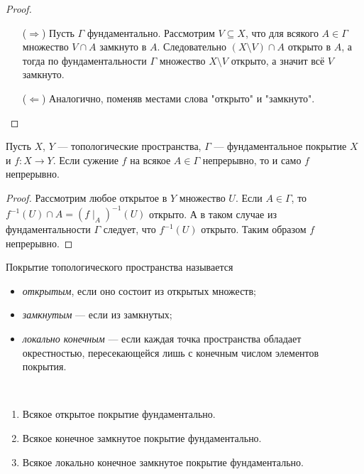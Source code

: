 \documentclass[12pt,a4paper]{article}
\begin{document}
    \begin{proof}
        \begin{itemize}
            \item[($\Rightarrow$)] Пусть $\Gamma$ фундаментально. Рассмотрим $V \subseteq X$, что для всякого $A \in \Gamma$ множество $V \cap A$ замкнуто в $A$. Следовательно $(X \setminus V) \cap A$ открыто в $A$, а тогда по фундаментальности $\Gamma$ множество $X \setminus V$ открыто, а значит всё $V$ замкнуто.
            \item[($\Leftarrow$)] Аналогично, поменяв местами слова "открыто" и "замкнуто".
        \end{itemize}
    \end{proof}

    \begin{theorem}
        Пусть $X$, $Y$ --- топологические пространства, $\Gamma$ --- фундаментальное покрытие $X$ и $f: X \to Y$. Если сужение $f$ на всякое $A \in \Gamma$ непрерывно, то и само $f$ непрерывно.
    \end{theorem}

    \begin{proof}
        Рассмотрим любое открытое в $Y$ множество $U$. Если $A \in \Gamma$, то $f^{-1}(U) \cap A = (f{\mid}_A)^{-1}(U)$ открыто. А в таком случае из фундаментальности $\Gamma$ следует, что $f^{-1}(U)$ открыто. Таким образом $f$ непрерывно.
    \end{proof}

    \begin{definition}
        Покрытие топологического пространства называется
        \begin{itemize}
            \item \emph{открытым}, если оно состоит из открытых множеств;
            \item \emph{замкнутым} --- если из замкнутых;
            \item \emph{локально конечным} --- если каждая точка пространства обладает окрестностью, пересекающейся лишь с конечным числом элементов покрытия.
        \end{itemize}
    \end{definition}

    \begin{theorem}\ 
        \begin{enumerate}
            \item Всякое открытое покрытие фундаментально.
            \item Всякое конечное замкнутое покрытие фундаментально.
            \item Всякое локально конечное замкнутое покрытие фундаментально.
        \end{enumerate}
    \end{theorem}
\end{document}
